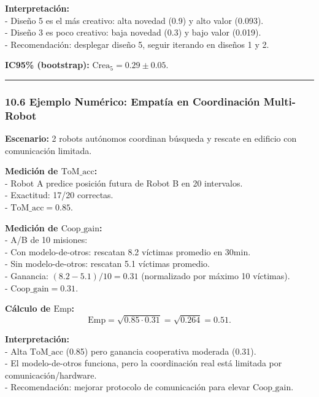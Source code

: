 \textbf{Interpretación:}\\
- Diseño 5 es el más creativo: alta novedad (0.9) y alto valor
(0.093).\\
- Diseño 3 es poco creativo: baja novedad (0.3) y bajo valor (0.019).\\
- Recomendación: desplegar diseño 5, seguir iterando en diseños 1 y 2.

\textbf{IC95\% (bootstrap):} \(\text{Crea}_5 = 0.29 \pm 0.05\).

\begin{center}\rule{0.5\linewidth}{0.5pt}\end{center}

\subsubsection{10.6 Ejemplo Numérico: Empatía en Coordinación
Multi-Robot}\label{ejemplo-numuxe9rico-empatuxeda-en-coordinaciuxf3n-multi-robot}

\textbf{Escenario:} 2 robots autónomos coordinan búsqueda y rescate en
edificio con comunicación limitada.

\textbf{Medición de \(\text{ToM\_acc}\):}\\
- Robot A predice posición futura de Robot B en 20 intervalos.\\
- Exactitud: 17/20 correctas.\\
- \(\text{ToM\_acc} = 0.85\).

\textbf{Medición de \(\text{Coop\_gain}\):}\\
- A/B de 10 misiones:\\
- Con modelo-de-otros: rescatan 8.2 víctimas promedio en 30min.\\
- Sin modelo-de-otros: rescatan 5.1 víctimas promedio.\\
- Ganancia: \((8.2 - 5.1) / 10 = 0.31\) (normalizado por máximo 10
víctimas).\\
- \(\text{Coop\_gain} = 0.31\).

\textbf{Cálculo de \(\text{Emp}\):}\\
\[
\text{Emp} = \sqrt{0.85 \cdot 0.31} = \sqrt{0.264} = 0.51.
\]

\textbf{Interpretación:}\\
- Alta \(\text{ToM\_acc}\) (0.85) pero ganancia cooperativa moderada
(0.31).\\
- El modelo-de-otros funciona, pero la coordinación real está limitada
por comunicación/hardware.\\
- Recomendación: mejorar protocolo de comunicación para elevar
\(\text{Coop\_gain}\).

